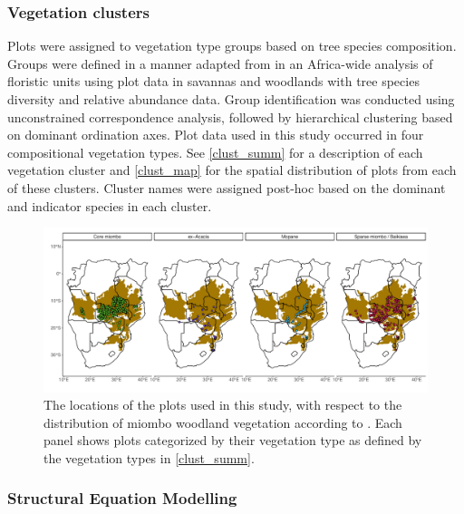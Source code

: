 \documentclass[11pt,a4paper]{article}
\begin{document}
\subsubsection{Vegetation clusters}

Plots were assigned to vegetation type groups based on tree species composition. Groups were defined in a manner adapted from \citet{Fayolle2018} in an Africa-wide analysis of floristic units using plot data in savannas and woodlands with tree species diversity and relative abundance data. Group identification was conducted using unconstrained correspondence analysis, followed by hierarchical clustering based on dominant ordination axes. Plot data used in this study occurred in four compositional vegetation types. See \autoref{clust_summ} for a description of each vegetation cluster and \autoref{clust_map} for the spatial distribution of plots from each of these clusters. Cluster names were assigned post-hoc based on the dominant and indicator species in each cluster.

\begin{landscape}


\begin{figure}[H]
\centering
	\includegraphics[width=1.4\textwidth]{clust_map}
	\caption{The locations of the \nplots{} plots used in this study, with respect to the distribution of miombo woodland vegetation according to \citet{White1987}. Each panel shows plots categorized by their vegetation type as defined by the vegetation types in \autoref{clust_summ}.}
	\label{clust_map}
\end{figure}
\end{landscape}

\subsubsection{Structural Equation Modelling}
\end{document}
